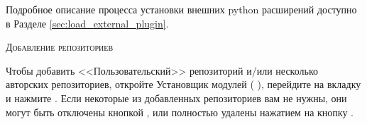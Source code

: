 Подробное описание процесса установки внешних python расширений доступно в
Разделе \ref{sec:load_external_plugin}.

\begin{Tip} \caption{\textsc{Добавление репозиториев}}
Чтобы добавить <<Пользовательский>> репозиторий и/или несколько авторских
репозиториев, откройте Установщик модулей ( \arrow
{}), перейдите на
вкладку  и нажмите .
Если некоторые из добавленных репозиториев вам не нужны, они могут быть
отключены кнопкой , или полностью удалены нажатием
на кнопку .
\end{Tip}
\FloatBarrier
